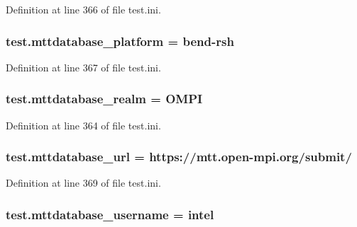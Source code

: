 Definition at line 366 of file test.\-ini.

\hypertarget{namespacetest_ad84ae15a19ed5e82248ae54549e3d0d9}{
\subsubsection[{mttdatabase\-\_\-platform}]{\setlength{\rightskip}{0pt plus 5cm}test.\-mttdatabase\-\_\-platform = bend-\/rsh}}\label{namespacetest_ad84ae15a19ed5e82248ae54549e3d0d9}


Definition at line 367 of file test.\-ini.

\hypertarget{namespacetest_a710122d20448f56ed2401cc3aa94ba04}{
\subsubsection[{mttdatabase\-\_\-realm}]{\setlength{\rightskip}{0pt plus 5cm}test.\-mttdatabase\-\_\-realm = O\-M\-P\-I}}\label{namespacetest_a710122d20448f56ed2401cc3aa94ba04}


Definition at line 364 of file test.\-ini.

\hypertarget{namespacetest_ad3dde693468cd5e08314bbab4c9f58ef}{
\subsubsection[{mttdatabase\-\_\-url}]{\setlength{\rightskip}{0pt plus 5cm}test.\-mttdatabase\-\_\-url = https\-://mtt.\-open-\/mpi.\-org/submit/}}\label{namespacetest_ad3dde693468cd5e08314bbab4c9f58ef}


Definition at line 369 of file test.\-ini.

\hypertarget{namespacetest_a7097267c4c5626a8f8e3376be40a9a92}{
\subsubsection[{mttdatabase\-\_\-username}]{\setlength{\rightskip}{0pt plus 5cm}test.\-mttdatabase\-\_\-username = intel}}\label{namespacetest_a7097267c4c5626a8f8e3376be40a9a92}


